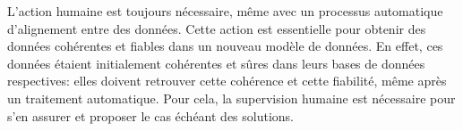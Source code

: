 \bigskip
\bigskip
L'action humaine est toujours nécessaire, même avec un processus automatique d'alignement entre des données. Cette action est essentielle pour obtenir des données cohérentes et fiables dans un nouveau modèle de données. En effet, ces données étaient initialement cohérentes et sûres dans leurs bases de données respectives: elles doivent retrouver cette cohérence et cette fiabilité, même après un traitement automatique. Pour cela, la supervision humaine est nécessaire pour s'en assurer et proposer le cas échéant des solutions. 